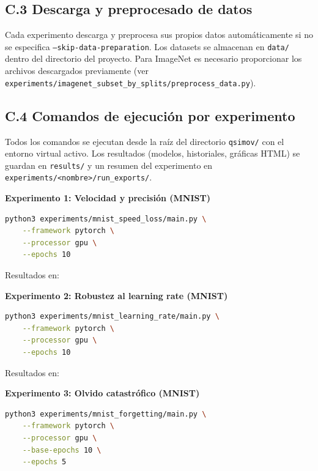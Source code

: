 \subsection{C.3 Descarga y preprocesado de datos}

Cada experimento descarga y preprocesa sus propios datos automáticamente si no se especifica
\texttt{--skip-data-preparation}. Los datasets se almacenan en \texttt{data/} dentro del directorio
del proyecto. Para ImageNet es necesario proporcionar los archivos descargados previamente (ver
\texttt{experiments/imagenet\_subset\_by\_splits/preprocess\_data.py}).

\subsection{C.4 Comandos de ejecución por experimento}

Todos los comandos se ejecutan desde la raíz del directorio \texttt{qsimov/} con el entorno virtual
activo. Los resultados (modelos, historiales, gráficas HTML) se guardan en \texttt{results/} y un
resumen del experimento en \texttt{experiments/<nombre>/run\_exports/}.

\textbf{Experimento 1: Velocidad y precisión (MNIST)}

\begin{lstlisting}[language=bash]
python3 experiments/mnist_speed_loss/main.py \
    --framework pytorch \
    --processor gpu \
    --epochs 10
\end{lstlisting}

Resultados en: 

\textbf{Experimento 2: Robustez al learning rate (MNIST)}

\begin{lstlisting}[language=bash]
python3 experiments/mnist_learning_rate/main.py \
    --framework pytorch \
    --processor gpu \
    --epochs 10
\end{lstlisting}

Resultados en: 

\textbf{Experimento 3: Olvido catastrófico (MNIST)}

\begin{lstlisting}[language=bash]
python3 experiments/mnist_forgetting/main.py \
    --framework pytorch \
    --processor gpu \
    --base-epochs 10 \
    --epochs 5
\end{lstlisting}

